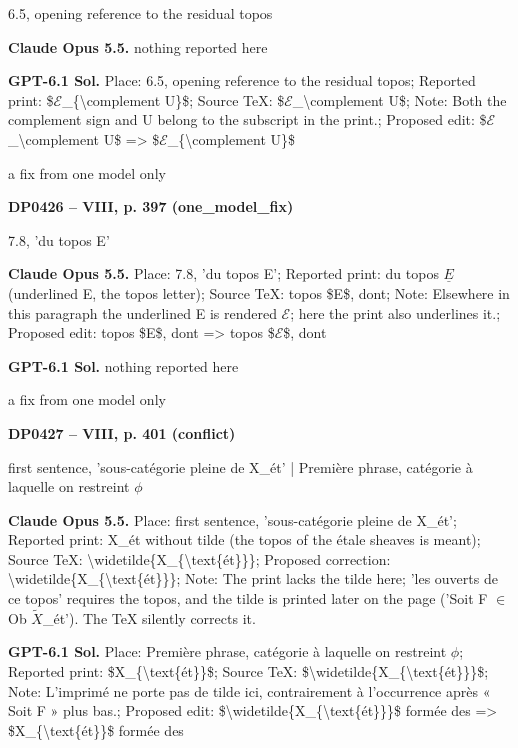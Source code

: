 6.5, opening reference to the residual topos\par
\textbf{Claude Opus 5.5.} nothing reported here\par
\textbf{GPT-6.1 Sol.} Place: 6.5, opening reference to the residual topos; Reported print: \$\ensuremath{\mathcal{E}}\_\{\textbackslash{}complement U\}\$; Source TeX: \$\ensuremath{\mathcal{E}}\_\textbackslash{}complement U\$; Note: Both the complement sign and U belong to the subscript in the print.; Proposed edit: \$\ensuremath{\mathcal{E}}\_\textbackslash{}complement U\$ =\allowbreak > \$\ensuremath{\mathcal{E}}\_\{\textbackslash{}complement U\}\$\par
a fix from one model only\par
\par\noindent\hypertarget{DP0426}{}\textbf{DP0426 -- VIII, p. 397 (one\_model\_fix)}\par
7.8, 'du topos E'\par
\textbf{Claude Opus 5.5.} Place: 7.8, 'du topos E'; Reported print: du topos \ensuremath{\underline{E}} (underlined E, the topos letter); Source TeX: topos \$E\$, dont; Note: Elsewhere in this paragraph the underlined E is rendered \ensuremath{\mathcal{E}}; here the print also underlines it.; Proposed edit: topos \$E\$, dont =\allowbreak > topos \$\ensuremath{\mathcal{E}}\$, dont\par
\textbf{GPT-6.1 Sol.} nothing reported here\par
a fix from one model only\par
\par\noindent\hypertarget{DP0427}{}\textbf{DP0427 -- VIII, p. 401 (conflict)}\par
first sentence, 'sous-catégorie pleine de X\_ét' | Première phrase, catégorie à laquelle on restreint \ensuremath{\phi}\par
\textbf{Claude Opus 5.5.} Place: first sentence, 'sous-catégorie pleine de X\_ét'; Reported print: X\_ét without tilde (the topos of the étale sheaves is meant); Source TeX: \textbackslash{}widetilde\{X\_\{\textbackslash{}text\{ét\}\}\}; Proposed correction: \textbackslash{}widetilde\{X\_\{\textbackslash{}text\{ét\}\}\}; Note: The print lacks the tilde here; 'les ouverts de ce topos' requires the topos, and the tilde is printed later on the page ('Soit F \ensuremath{\in} Ob \ensuremath{\tilde{X}}\_ét'). The TeX silently corrects it.\par
\textbf{GPT-6.1 Sol.} Place: Première phrase, catégorie à laquelle on restreint \ensuremath{\phi}; Reported print: \$X\_\{\textbackslash{}text\{ét\}\}\$; Source TeX: \$\textbackslash{}widetilde\{X\_\{\textbackslash{}text\{ét\}\}\}\$; Note: L'imprimé ne porte pas de tilde ici, contrairement à l'occurrence après « Soit F » plus bas.; Proposed edit: \$\textbackslash{}widetilde\{X\_\{\textbackslash{}text\{ét\}\}\}\$ formée des =\allowbreak > \$X\_\{\textbackslash{}text\{ét\}\}\$ formée des\par
